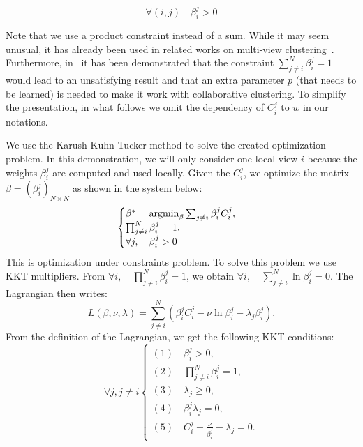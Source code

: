 $$\forall (i,j) \quad \beta^j_i >0 $$ 

Note that we use a product constraint instead of a sum. While it may seem unusual, it has already been used in related works on multi-view clustering~\cite{CarvalhoML15}. Furthermore, in~\cite{Sublime2017} it has been demonstrated that the constraint $\sum_{j \neq i}^N \beta^j_i = 1$ would lead to an unsatisfying result and that an extra parameter $p$ (that needs to be learned) is needed to make it work with collaborative clustering. To simplify the presentation, in what follows we omit the dependency of $C^j_i$ to $w$ in our notations.

We use the Karush-Kuhn-Tucker method to solve the created optimization problem. In this demonstration, we will only consider one local view $i$ because the weights $\beta^j_i$ are computed and used locally.
Given the $C^j_i$, we  optimize the matrix $\beta = {\left(\beta^j_i\right)}_{N \times N}$ as shown in the system below:
\begin{equation}
    \begin{cases}
        \beta^* =  \operatornamewithlimits{argmin}_{\beta}  \sum_{j \neq i} \beta^j_i  C^j_i ,      \\
        \prod_{j \neq i}^N \beta^j_i  = 1. \\
        \forall j, \quad \beta^j_i >   0 \\      
    \end{cases} 
    \label{eq:KKT0-app}
\end{equation} 
This is optimization under constraints problem. To solve this problem  we use KKT multipliers.
From   $\forall i, \quad \prod_{j \neq i}^N \beta^j_i  = 1$, we obtain
$\forall i, \quad \sum_{j \neq i}^N \ln  \beta^j_i   = 0$. The Lagrangian then writes: 
\begin{equation}
    L(\beta,\nu,\lambda)= \sum_{j \neq i}^N ( \beta^j_i  C^j_i - \nu  \ln  \beta^j_i  - \lambda_j   \beta^j_i ).
    \label{eq:Lag-KKT}
\end{equation}
From the definition of the Lagrangian, we get the following KKT conditions:
\begin{equation}
    \forall j, j \neq i
    \begin{cases}
        (1) \quad \beta^j_i > 0,   \\
        (2) \quad \prod_{j \neq i}^N \beta^j_i  = 1,  \\
        (3) \quad \lambda_j \geq 0,  \\
        (4) \quad \beta^j_i  \lambda_j = 0,   \\
        (5) \quad  C^j_i -  \frac{\nu}{ \beta^j_i }   - \lambda_j = 0.
    \end{cases} 
    \label{eq:app-kkt0}
\end{equation} 

